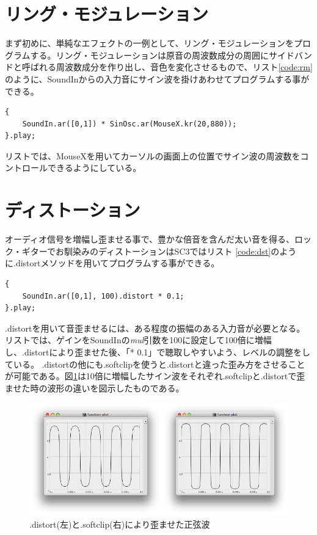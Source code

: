 \documentclass{jsarticle}
\begin{document}
\section{リング・モジュレーション}
まず初めに、単純なエフェクトの一例として、リング・モジュレーションをプログラムする。リング・モジュレーションは原音の周波数成分の周囲にサイドバンドと呼ばれる周波数成分を作り出し、音色を変化させるもので、リスト\ref{code:rm}のように、SoundInからの入力音にサイン波を掛けあわせてプログラムする事ができる。

\begin{lstlisting}[caption=リング・モジュレーション,label=code:rm]
{
	SoundIn.ar([0,1]) * SinOsc.ar(MouseX.kr(20,880));
}.play;
\end{lstlisting}

リストでは、MouseXを用いてカーソルの画面上の位置でサイン波の周波数をコントロールできるようにしている。

\section{ディストーション}
オーディオ信号を増幅し歪ませる事で、豊かな倍音を含んだ太い音を得る、ロック・ギターでお馴染みのディストーションはSC3ではリスト
\ref{code:dst}のように.distortメソッドを用いてプログラムする事ができる。

\begin{lstlisting}[caption=ディストーション, label=code:dst]
{
	SoundIn.ar([0,1], 100).distort * 0.1;
}.play;
\end{lstlisting}

.distortを用いて音歪ませるには、ある程度の振幅のある入力音が必要となる。
リストでは、ゲインをSoundInの{\it mul}引数を100に設定して100倍に増幅し、.distortにより歪ませた後、「* 0.1」で聴取しやすいよう、レベルの調整をしている。
.distortの他にも.softclipを使うと.distortと違った歪み方をさせることが可能である。図\ref{fig:comparison}は10倍に増幅したサイン波をそれぞれ.softclipと.distortで歪ませた時の波形の違いを図示したものである。

\begin{figure}[htbp]
	\begin{center}
		\includegraphics[scale=0.6]{comparison.pdf}
	\end{center}
	\caption{.distort(左)と.softclip(右)により歪ませた正弦波}
	\label{fig:comparison}
\end{figure}
\end{document}
